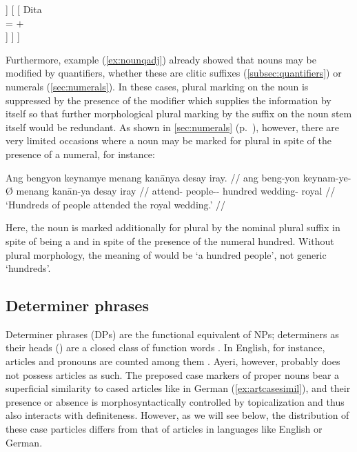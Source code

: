 \a\label{ex:animclashname} %
\ljudge*\begin{forest}
[\anno{\xhead{N}}
	[\anno{Cl}
		[{%
			eng \\
			\ups{\Anim} = $-$ \\
			\ups{\Case} = \Aarg{} \\
		}]
	]
	[
		[{%
			Dita \\
			\ups{\Anim} = $+$ \\
		}]
	]
]
\end{forest}
\xe

Furthermore, example (\ref{ex:nounqadj}) already showed that nouns may be
modified by quantifiers, whether these are clitic suffixes
(\autoref{subsec:quantifiers}) or numerals (\autoref{sec:numerals}). In these
cases, plural marking on the noun is suppressed by the presence of the modifier
which supplies the information by itself so that further morphological plural
marking by the suffix  on the noun stem itself would be
redundant. As shown in \autoref{sec:numerals} (p.~\pageref{hundreds}), however,
there are very limited occasions where a noun may be marked for plural in spite
of the presence of a numeral, for instance:

\ex\begingl
	\gla Ang bengyon keynamye menang kanānya {desay iray}. //
	\glb ang beng-yon keynam-ye-Ø menang kanān-ya {desay iray} //
	\glc \AgtT{} attend-\TplN{} people-\Pl{}-\Top{} hundred wedding-\Loc{} 
		royal //
	\glft `Hundreds of people attended the royal wedding.' //
\endgl\xe

Here, the noun  is marked additionally for plural
by the nominal plural suffix  in spite of being a  and in spite of the presence of the numeral 
{hundred}. Without plural morphology, the meaning of  would be `a hundred people', not generic `hundreds'.

\subsection{Determiner phrases}
\label{subsec:dps}

Determiner phrases (DPs) are the functional equivalent of NPs; determiners as
their heads () are a closed class of function words \citep[102]
{bresnan2016}. In English, for instance, articles and pronouns are counted
among them \citep[208--211]{carnie2013}. Ayeri, however, probably does not
possess articles as such. The preposed case markers of proper nouns bear a
superficial similarity to cased articles like in German
(\ref{ex:artcasesimil}), and their presence or absence is morphosyntactically
controlled by topicalization and thus also interacts with definiteness.
However, as we will see below, the distribution of these case particles differs
from that of articles in languages like English or German.

